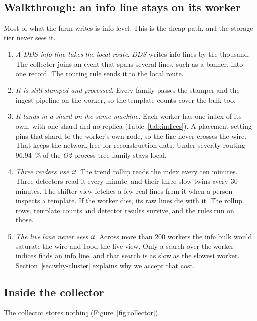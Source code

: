 \subsection{Walkthrough: an info line stays on its worker}\label{sec:design-walk-info}

Most of what the farm writes is info level. This is the cheap path, and the storage tier never sees it.

\begin{enumerate}[itemsep=3pt]
\item \emph{A \textit{DDS} info line takes the local route.} \textit{DDS} writes info lines by the thousand. The collector joins an event that spans several lines, such as a banner, into one record. The routing rule sends it to the local route.
\item \emph{It is still stamped and processed.} Every family passes the stamper and the ingest pipeline on the worker, so the template counts cover the bulk too.
\item \emph{It lands in a shard on the same machine.} Each worker has one index of its own, with one shard and no replica (Table~\ref{tab:indices}). A placement setting pins that shard to the worker's own node, so the line never crosses the wire. That keeps the network free for reconstruction data. Under severity routing 96.94~\% of the \textit{O2} process-tree family stays local.
\item \emph{Three readers use it.} The trend rollup reads the index every ten minutes. Three detectors read it every minute, and their three slow twins every 30 minutes. The shifter view fetches a few real lines from it when a person inspects a template. If the worker dies, its raw lines die with it. The rollup rows, template counts and detector results survive, and the rules run on those.
\item \emph{The live lane never sees it.} Across more than 200 workers the info bulk would saturate the wire and flood the live view. Only a search over the worker indices finds an info line, and that search is as slow as the slowest worker. Section~\ref{sec:why-cluster} explains why we accept that cost.
\end{enumerate}

\subsection{Inside the collector}\label{sec:design-collector}

The collector stores nothing (Figure~\ref{fig:collector}).


